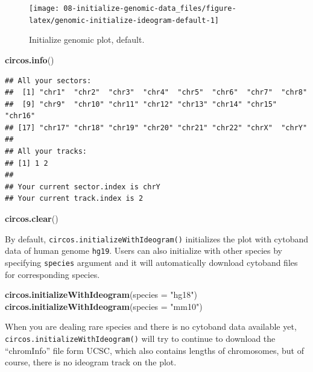 \documentclass[]{book}
\newenvironment{Shaded}{\begin{snugshade}}{\end{snugshade}}
\newcommand{\KeywordTok}[1]{\textcolor[rgb]{0.13,0.29,0.53}{\textbf{#1}}}
\newcommand{\DataTypeTok}[1]{\textcolor[rgb]{0.13,0.29,0.53}{#1}}
\newcommand{\StringTok}[1]{\textcolor[rgb]{0.31,0.60,0.02}{#1}}
\newcommand{\NormalTok}[1]{#1}
\begin{document}
\begin{figure}

{\centering \texttt{[image: 08-initialize-genomic-data\_files/figure-latex/genomic-initialize-ideogram-default-1]} 

}

\caption{Initialize genomic plot, default.}\label{fig:genomic-initialize-ideogram-default}
\end{figure}

\begin{Shaded}
\begin{Highlighting}[]
\KeywordTok{circos.info}\NormalTok{()}
\end{Highlighting}
\end{Shaded}

\begin{verbatim}
## All your sectors:
##  [1] "chr1"  "chr2"  "chr3"  "chr4"  "chr5"  "chr6"  "chr7"  "chr8" 
##  [9] "chr9"  "chr10" "chr11" "chr12" "chr13" "chr14" "chr15" "chr16"
## [17] "chr17" "chr18" "chr19" "chr20" "chr21" "chr22" "chrX"  "chrY" 
## 
## All your tracks:
## [1] 1 2
## 
## Your current sector.index is chrY
## Your current track.index is 2
\end{verbatim}

\begin{Shaded}
\begin{Highlighting}[]
\KeywordTok{circos.clear}\NormalTok{()}
\end{Highlighting}
\end{Shaded}

By default, \texttt{circos.initializeWithIdeogram()} initializes the
plot with cytoband data of human genome \texttt{hg19}. Users can also
initialize with other species by specifying \texttt{species} argument
and it will automatically download cytoband files for corresponding
species.

\begin{Shaded}
\begin{Highlighting}[]
\KeywordTok{circos.initializeWithIdeogram}\NormalTok{(}\DataTypeTok{species =} \StringTok{"hg18"}\NormalTok{)}
\KeywordTok{circos.initializeWithIdeogram}\NormalTok{(}\DataTypeTok{species =} \StringTok{"mm10"}\NormalTok{)}
\end{Highlighting}
\end{Shaded}

When you are dealing rare species and there is no cytoband data
available yet, \texttt{circos.initializeWithIdeogram()} will try to
continue to download the ``chromInfo'' file form UCSC, which also
contains lengths of chromosomes, but of course, there is no ideogram
track on the plot.
\end{document}
